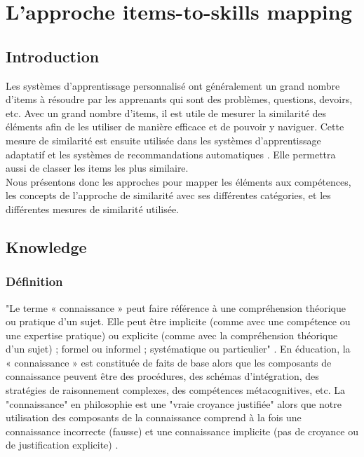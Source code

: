 \chapter{L'approche items-to-skills mapping}
\minitoc
\thispagestyle{empty}
\newpage
\section{Introduction}
Les systèmes d'apprentissage personnalisé ont généralement un grand nombre d’items à résoudre par les apprenants qui sont des problèmes, questions, devoirs, etc. Avec un grand nombre d’items, il est utile de mesurer la similarité des éléments afin de les utiliser de manière efficace et de pouvoir y naviguer. Cette mesure de similarité est ensuite utilisée dans les systèmes d'apprentissage adaptatif et les systèmes de recommandations automatiques \cite{pelanek2018measuring}. Elle permettra aussi de classer les items les plus similaire.  \\
Nous présentons donc les approches pour mapper les éléments aux compétences, les concepts de l’approche de similarité avec ses différentes catégories, et les différentes mesures de similarité utilisée.
\section{Knowledge}
\subsection{Définition}
"Le terme « connaissance » peut faire référence à une compréhension théorique ou pratique d'un sujet. Elle peut être implicite (comme avec une compétence ou une expertise pratique) ou explicite (comme avec la compréhension théorique d'un sujet) ; formel ou informel ; systématique ou particulier" \cite{knowledge_definition}. En éducation, la « connaissance » est constituée de faits de base alors que les composants de connaissance peuvent être des procédures, des schémas d’intégration, des stratégies de raisonnement complexes, des compétences métacognitives, etc. La "connaissance" en philosophie est une "vraie croyance justifiée" alors que notre utilisation des composants de la connaissance comprend à la fois une connaissance incorrecte (fausse) et une connaissance implicite (pas de croyance ou de justification explicite) \cite{bloom1956taxonomy}.
